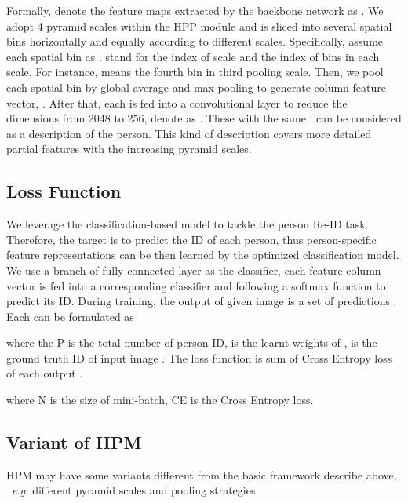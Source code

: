 \documentclass[letterpaper]{article} \usepackage{aaai19}  \usepackage{times}  \usepackage{helvet}  \usepackage{courier}  \usepackage{url}  \usepackage{graphicx}  \frenchspacing  \setlength{\pdfpagewidth}{8.5in}  \setlength{\pdfpageheight}{11in}  \usepackage{multirow}
\newcommand{\eg}{\emph{e.g. }}
\begin{document}
Formally, denote the feature maps extracted by the backbone network as . We adopt 4 pyramid scales within the HPP module and  is sliced into several spatial bins horizontally and equally according to different scales. Specifically,
assume each spatial bin as .  stand for the index of scale and the index of bins in each scale. For instance,  means the fourth bin in third pooling scale. Then, we pool each spatial bin  by global average and max pooling to generate column feature vector, .  After that, each  is fed into a convolutional layer to reduce the dimensions from 2048 to 256, denote as . These  with the same i can be considered as a description of the person. This kind of description covers more detailed partial features with the increasing pyramid scales.

\subsection{Loss Function}
We leverage the classification-based model to tackle the person Re-ID task. Therefore, the target is to predict the ID of each person, thus person-specific feature representations can be then learned by the optimized classification model. We use a branch of fully connected layer as the classifier, each feature column vector  is fed into a corresponding classifier  and following a softmax function to predict its ID. During training, the output of given image  is a set of predictions . Each  can be formulated as 

where the P is the total number of person ID,  is the learnt weights of ,  is the ground truth ID of input image . The loss function is sum of Cross Entropy loss of each output .

where N is the size of mini-batch, CE is the Cross Entropy loss.








\subsection{Variant of HPM}
HPM may have some variants different from the basic framework describe above, ~\eg different pyramid scales and pooling strategies. 
\end{document}

